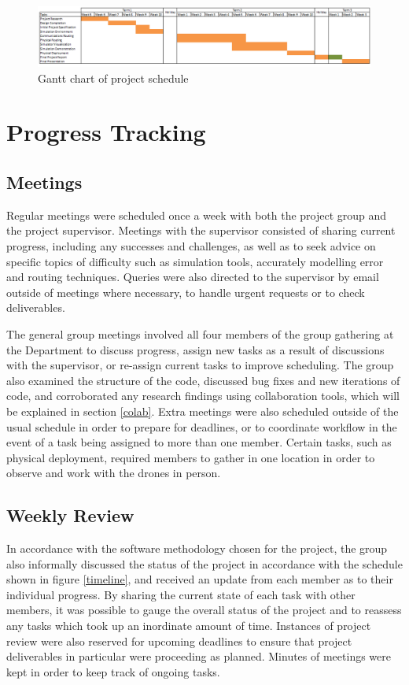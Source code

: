 \begin{figure}
\centering	
\includegraphics[scale=1]{img/progantt.png}
\caption{Gantt chart of project schedule}
\label{gantt}
\end{figure}

\section{Progress Tracking}

\subsection{Meetings}
Regular meetings were scheduled once a week with both the project group and the project supervisor. Meetings with the supervisor consisted of sharing current progress, including any successes and challenges, as well as to seek advice on specific topics of difficulty such as simulation tools, accurately modelling error and routing techniques. Queries were also directed to the supervisor by email outside of meetings where necessary, to handle urgent requests or to check deliverables. 

The general group meetings involved all four members of the group gathering at the Department to discuss progress, assign new tasks as a result of discussions with the supervisor, or re-assign current tasks to improve scheduling. The group also examined the structure of the code, discussed bug fixes and new iterations of code, and corroborated any research findings using collaboration tools, which will be explained in section \ref{colab}. Extra meetings were also scheduled outside of the usual schedule in order to prepare for deadlines, or to coordinate workflow in the event of a task being assigned to more than one member. Certain tasks, such as physical deployment, required members to gather in one location in order to observe and work with the drones in person.

\subsection{Weekly Review}
In accordance with the software methodology chosen for the project, the group also informally discussed the status of the project in accordance with the schedule shown in figure \ref{timeline}, and received an update from each member as to their individual progress. By sharing the current state of each task with other members, it was possible to gauge the overall status of the project and to reassess any tasks which took up an inordinate amount of time. Instances of project review were also reserved for upcoming deadlines to ensure that project deliverables in particular were proceeding as planned. Minutes of meetings were kept in order to keep track of ongoing tasks.

